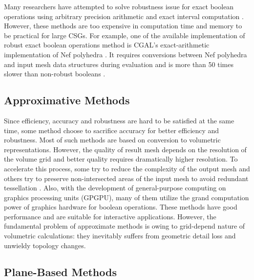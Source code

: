 \documentclass[10pt,journal,compsoc]{IEEEtran}
\begin{document}
Many researchers have attempted to solve robustness issue for exact boolean operations using arbitrary precision arithmetic \cite{banerjee1996topologically, fortune1995polyhedral, keyser2004esolid, granados2003boolean, hachenberger2005boolean} and exact interval computation \cite{fang1993robustness, hu1996robust, segal1990using}. However, these methods are too expensive in computation time and memory to be practical for large CSGs. For example, one of the available implementation of robust exact boolean operations method is CGAL's \cite{cgal:hk-bonp3-15a} exact-arithmetic implementation \cite{granados2003boolean} of Nef polyhedra \cite{bieri1988elementary}. It requires conversions between Nef polyhedra and input mesh data structures during evaluation and is more than 50 times slower than non-robust booleans \cite{bernstein2009fast}.


\subsection{Approximative Methods}

Since efficiency, accuracy and robustness are hard to be satisfied at the same time, some method choose to sacrifice accuracy for better efficiency and robustness. Most of such methods are based on conversion to volumetric representations. However, the quality of result mesh depends on the resolution of the volume grid and better quality requires dramatically higher resolution. To accelerate this process, some try to reduce the complexity of the output mesh \cite{varadhan2004topology} and others try to preserve non-intersected areas of the input mesh to avoid redundant tessellation \cite{pavic2010hybrid,wang2011approximate,zhao2011parallel,hable2005blister,ogayar2006gpu}. Also, with the development of general-purpose computing on graphics processing units (GPGPU), many of them utilize the grand computation power of graphics hardware for boolean operations. These methods have good performance and are suitable for interactive applications. However, the fundamental problem of approximate methods is owing to grid-depend nature of volumetric calculations: they inevitably suffers from geometric detail loss and unwieldy topology changes.


\subsection{Plane-Based Methods}
\label{sec:pbrelated}
\end{document}
